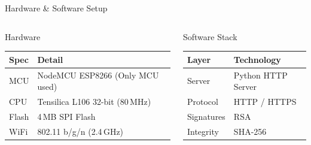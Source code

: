 \documentclass[aspectratio=169]{beamer}
\begin{document}
\begin{frame}{Hardware \& Software Setup}

\begin{columns}[T]
\begin{block}{Hardware}
\small
\begin{tabular}{l l}
\toprule
\textbf{Spec} & \textbf{Detail} \\
\midrule
MCU & NodeMCU ESP8266 (Only MCU used) \\
CPU & Tensilica L106 32-bit (80\,MHz) \\
Flash & 4\,MB SPI Flash \\
WiFi & 802.11 b/g/n (2.4\,GHz) \\
\bottomrule
\end{tabular}
\end{block}

\begin{block}{Software Stack}
\small
\begin{tabular}{l l}
\toprule
\textbf{Layer} & \textbf{Technology} \\
\midrule
Server & Python HTTP Server \\
Protocol & HTTP / HTTPS \\
Signatures & RSA \\
Integrity & SHA-256 \\
\bottomrule
\end{tabular}
\end{block}
\end{columns}

\end{frame}
\end{document}
